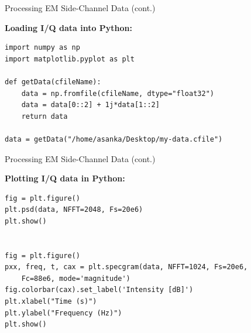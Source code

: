 \documentclass[handout]{beamer}
\begin{document}
\begin{frame}[fragile]{Processing EM Side-Channel Data (cont.)}

\footnotesize
\textbf{Loading I/Q data into Python:}
\vspace{30pt}

\begin{verbatim}
import numpy as np
import matplotlib.pyplot as plt

def getData(cfileName):
    data = np.fromfile(cfileName, dtype="float32")
    data = data[0::2] + 1j*data[1::2]
    return data

data = getData("/home/asanka/Desktop/my-data.cfile")
\end{verbatim}

\end{frame}


\begin{frame}[fragile]{Processing EM Side-Channel Data (cont.)}

\footnotesize
\textbf{Plotting I/Q data in Python:}
\vspace{30pt}

\begin{verbatim}
fig = plt.figure()
plt.psd(data, NFFT=2048, Fs=20e6)
plt.show()


fig = plt.figure()
pxx, freq, t, cax = plt.specgram(data, NFFT=1024, Fs=20e6, 
	Fc=88e6, mode='magnitude')
fig.colorbar(cax).set_label('Intensity [dB]')
plt.xlabel("Time (s)")
plt.ylabel("Frequency (Hz)")
plt.show()
\end{verbatim}

\end{frame}
\end{document}
